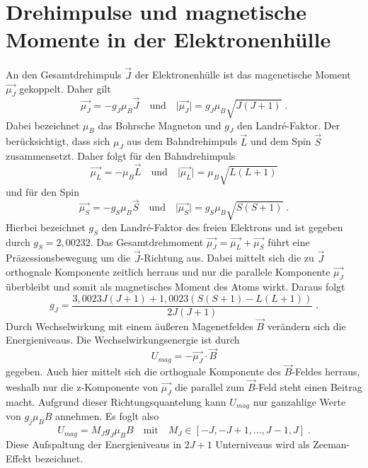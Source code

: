\section{Drehimpulse und magnetische Momente in der Elektronenhülle}
An den Gesamtdrehimpuls $ \vec{J}$ der Elektronenhülle ist das magenetische Moment $\vec{\mu_J}$
gekoppelt. Daher gilt
\begin{equation}
\vec{\mu_J} = -g_J \mu_B \vec{J} \quad \text{und} \quad
\lvert \vec{\mu_J} \rvert = g_J \mu_B \sqrt{J(J+1)}  \; .
\label{eq:muJ}
\end{equation}
Dabei bezeichnet $\mu_B$ das Bohrsche Magneton und $g_J$ den Landr\'{e}-Faktor. Der berücksichtigt,
dass sich $\mu_J$ aus dem Bahndrehimpuls $\vec{L}$ und dem Spin $\vec{S}$ zusammensetzt.
Daher folgt für den Bahndrehimpuls
\begin{equation}
\vec{\mu_L} = - \mu_B \vec{L} \quad \text{und} \quad
\lvert \vec{\mu_L} \rvert =  \mu_B \sqrt{L(L+1)}
\label{eq:muL}
\end{equation}
und für den Spin
\begin{equation}
\vec{\mu_S} = - g_S \mu_B \vec{S} \quad \text{und} \quad
\lvert \vec{\mu_S} \rvert = 	g_S \mu_B \sqrt{S(S+1)} \; .
\label{eq:muS}
\end{equation}
Hierbei bezeichnet $g_S$ den Landr\'{e}-Faktor des freien Elektrons und ist gegeben durch
$ g_S = 2,00232$. Das Gesamtdrehmoment $\vec{\mu_J} = \vec{\mu_L}+\vec{\mu_S}$ führt eine
Präzessionsbewegung um die $\vec{J}$-Richtung aus. Dabei mittelt sich die zu $\vec{J}$
orthognale Komponente zeitlich herraus und nur die parallele Komponente $\vec{\mu_J}$
überbleibt und somit als magnetisches Moment des Atoms wirkt. Daraus folgt
\begin{equation}
g_J = \frac{3,0023J(J+1) + 1,0023(S(S+1) - L(L+1))}{2J(J+1)}\; .
\label{eq:gJ}
\end{equation}
Durch Wechselwirkung mit einem äußeren Magenetfeldes $\vec{B}$ verändern sich die Energieniveaus.
Die Wechselwirkungsenergie ist durch
\begin{equation}
U_{mag} = - \vec{\mu_J} \cdot \vec{B}
\end{equation}
gegeben. Auch hier mittelt sich die orthognale Komponente des $\vec{B}$-Feldes herraus, weshalb nur
die z-Komponente von $\vec{\mu_J}$  die parallel zum $\vec{B}$-Feld steht einen Beitrag macht.
Aufgrund dieser Richtungsquantelung kann $U_{mag}$ nur ganzahlige Werte von $g_j \mu_B B$
annehmen. Es foglt also
\begin{equation}
U_{mag} = M_J g_J \mu_B B \quad \text{mit} \quad M_J \in [-J,-J+1,...,J-1,J] \; .
\end{equation}
Diese Aufspaltung der Energieniveaus in $2J+1$ Unterniveaus wird als Zeeman-Effekt bezeichnet.

